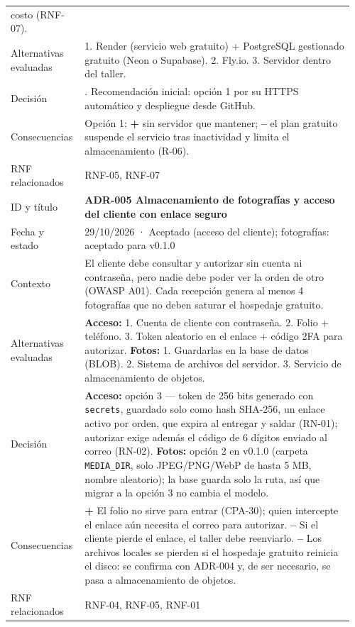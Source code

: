 {\begin{longtable}{@{}L{0.2\linewidth}L{0.76\linewidth}@{}}
costo (RNF-07). \\
Alternativas evaluadas & 1. Render (servicio web gratuito) + PostgreSQL gestionado gratuito (Neon o
Supabase). 2. Fly.io. 3. Servidor dentro del taller. \\
Decisión & \pendiente{}. Recomendación inicial: opción 1 por su HTTPS
automático y despliegue desde GitHub. \\
Consecuencias & Opción 1: \textbf{+} sin servidor que mantener; \textbf{--} el plan gratuito suspende el
servicio tras inactividad y limita el almacenamiento (R-06). \\
RNF relacionados & RNF-05, RNF-07 \\
\midrule
ID y título & \textbf{ADR-005 Almacenamiento de fotografías y acceso del cliente con enlace seguro} \\
Fecha y estado & 29/10/2026 · Aceptado (acceso del cliente); fotografías: aceptado para v0.1.0 \\
Contexto & El cliente debe consultar y autorizar sin cuenta ni contraseña, pero nadie debe poder ver la
orden de otro (OWASP A01). Cada recepción genera al menos 4 fotografías que no deben saturar el
hospedaje gratuito. \\
Alternativas evaluadas & \textbf{Acceso:} 1. Cuenta de cliente con contraseña. 2. Folio + teléfono.
3. Token aleatorio en el enlace + código 2FA para autorizar. \textbf{Fotos:} 1. Guardarlas en la base de
datos (BLOB). 2. Sistema de archivos del servidor. 3. Servicio de almacenamiento de objetos. \\
Decisión & \textbf{Acceso:} opción 3 --- token de 256 bits generado con \texttt{secrets}, guardado solo como
hash SHA-256, un enlace activo por orden, que expira al entregar y saldar (RN-01); autorizar exige además
el código de 6 dígitos enviado al correo (RN-02). \textbf{Fotos:} opción 2 en v0.1.0 (carpeta
\texttt{MEDIA\_DIR}, solo JPEG/PNG/WebP de hasta 5 MB, nombre aleatorio); la base guarda solo la ruta, así
que migrar a la opción 3 no cambia el modelo. \\
Consecuencias & \textbf{+} El folio no sirve para entrar (CPA-30); quien intercepte el enlace aún necesita
el correo para autorizar. \textbf{--} Si el cliente pierde el enlace, el taller debe reenviarlo. \textbf{--}
Los archivos locales se pierden si el hospedaje gratuito reinicia el disco: se confirma con
ADR-004 y, de ser necesario, se pasa a almacenamiento de objetos. \\
RNF relacionados & RNF-04, RNF-05, RNF-01 \\
\midrule

\end{longtable}}
